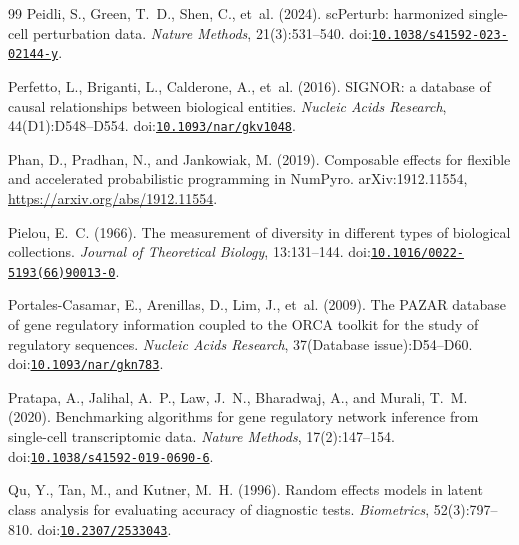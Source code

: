 \documentclass[11pt,a4paper]{article}
\begin{document}
\begin{thebibliography}{99}
Peidli, S., Green, T.~D., Shen, C., et~al. (2024).
\newblock sc{P}erturb: harmonized single-cell perturbation data.
\newblock \emph{Nature Methods}, 21(3):531--540.
\newblock doi:\href{https://doi.org/10.1038/s41592-023-02144-y}{\nolinkurl{10.1038/s41592-023-02144-y}}.

Perfetto, L., Briganti, L., Calderone, A., et~al. (2016).
\newblock SIGNOR: a database of causal relationships between biological entities.
\newblock \emph{Nucleic Acids Research}, 44(D1):D548--D554.
\newblock doi:\href{https://doi.org/10.1093/nar/gkv1048}{\nolinkurl{10.1093/nar/gkv1048}}.

Phan, D., Pradhan, N., and Jankowiak, M. (2019).
\newblock Composable effects for flexible and accelerated probabilistic programming in {NumPyro}.
\newblock arXiv:1912.11554, \url{https://arxiv.org/abs/1912.11554}.

Pielou, E.~C. (1966).
\newblock The measurement of diversity in different types of biological collections.
\newblock \emph{Journal of Theoretical Biology}, 13:131--144.
\newblock doi:\href{https://doi.org/10.1016/0022-5193(66)90013-0}{\nolinkurl{10.1016/0022-5193(66)90013-0}}.

Portales-Casamar, E., Arenillas, D., Lim, J., et~al. (2009).
\newblock The PAZAR database of gene regulatory information coupled to the ORCA toolkit for the study of regulatory sequences.
\newblock \emph{Nucleic Acids Research}, 37(Database issue):D54--D60.
\newblock doi:\href{https://doi.org/10.1093/nar/gkn783}{\nolinkurl{10.1093/nar/gkn783}}.

Pratapa, A., Jalihal, A.~P., Law, J.~N., Bharadwaj, A., and Murali, T.~M. (2020).
\newblock Benchmarking algorithms for gene regulatory network inference from single-cell transcriptomic data.
\newblock \emph{Nature Methods}, 17(2):147--154.
\newblock doi:\href{https://doi.org/10.1038/s41592-019-0690-6}{\nolinkurl{10.1038/s41592-019-0690-6}}.

Qu, Y., Tan, M., and Kutner, M.~H. (1996).
\newblock Random effects models in latent class analysis for evaluating accuracy of diagnostic tests.
\newblock \emph{Biometrics}, 52(3):797--810.
\newblock doi:\href{https://doi.org/10.2307/2533043}{\nolinkurl{10.2307/2533043}}.


\end{thebibliography}
\end{document}
